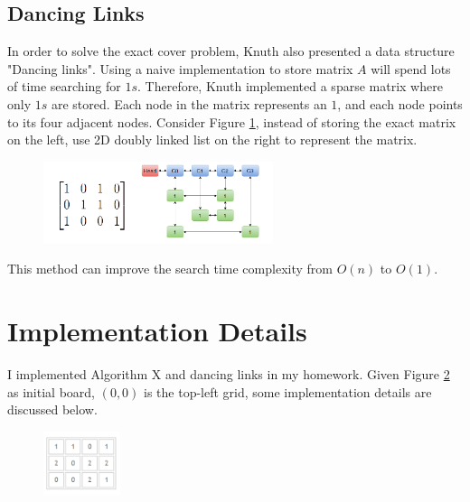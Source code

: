 \documentclass[12pt]{article}
\begin{document}
\subsection*{Dancing Links}
In order to solve the exact cover problem, Knuth also presented a data structure "Dancing links". Using a naive implementation to store matrix $A$ will spend lots of time searching for $1s$. Therefore, Knuth implemented a sparse matrix where only $1s$ are stored. Each node in the matrix represents an $1$, and each node points to its four adjacent nodes. Consider Figure \ref{fig:dl}, instead of storing the exact matrix on the left, use 2D doubly linked list on the right to represent the matrix.
	\begin{figure}[H]
	\centering
	\includegraphics[width=0.6\textwidth]{fig_dl}
	\caption[Caption for the list of figures]{}
	\label{fig:dl}
	\end{figure}
This method can improve the search time complexity from $O(n)$ to $O(1)$.

\section{Implementation Details}
I implemented Algorithm X and dancing links in my homework. Given Figure \ref{fig:imp_init} as initial board, $(0,0)$ is the top-left grid, some implementation details are discussed below.
	\begin{figure}[H]
	\centering
	\includegraphics[width=0.2\textwidth]{fig_imp_init}
	\caption[Caption for the list of figures]{}
	\label{fig:imp_init}
	\end{figure}
\end{document}
